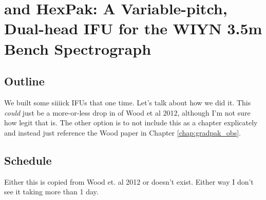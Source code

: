 \chapter[\GP Construction]{\GP and HexPak: A Variable-pitch, Dual-head IFU for the WIYN 3.5m Bench Spectrograph}
\label{chap:pak_build}



\section{Outline}
We built some siiiick IFUs that one time. Let's talk about how we did it. This
\emph{could} just be a more-or-less drop in of Wood et al 2012, although I'm
not sure how legit that is. The other option is to not include this as a
chapter explicately and instead just reference the Wood paper in Chapter
\ref{chap:gradpak_obs}.

\section{Schedule}
Either this is copied from Wood et. al 2012 or doesn't exist. Either way I
don't see it taking more than 1 day.



